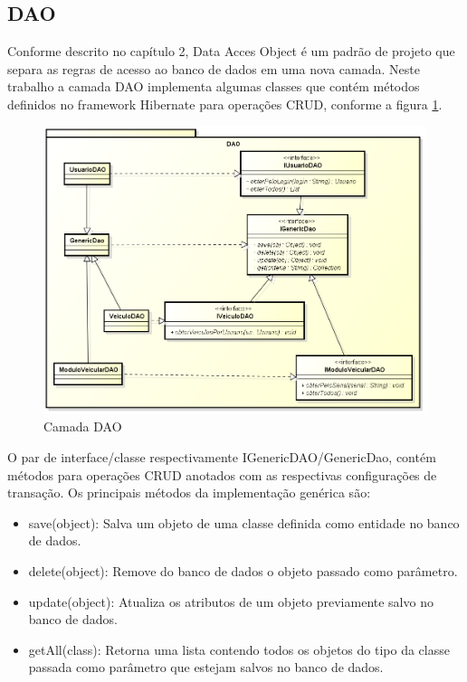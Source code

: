 \subsection{DAO}

Conforme descrito no capítulo 2, Data Acces Object é um padrão de projeto que separa as regras de acesso ao banco de dados em uma nova camada. Neste trabalho a camada DAO implementa algumas classes que contém métodos definidos no framework Hibernate para operações CRUD, conforme a figura \ref{fig:webmandao}.

\begin{figure}[!htb]
	\centering
	\includegraphics[width=\textwidth]{figures/dao_layer.png}
	\caption{Camada DAO}
	\label{fig:webmandao}
\end{figure}

O par de interface/classe respectivamente IGenericDAO/GenericDao, contém métodos para operações CRUD anotados com as respectivas configurações de transação. Os principais métodos da implementação genérica são:

\begin{itemize}
	\item save(object): Salva um objeto de uma classe definida como entidade no banco de dados.
	\item delete(object): Remove do banco de dados o objeto passado como parâmetro.
	\item update(object): Atualiza os atributos de um objeto previamente salvo no banco de dados.
	\item getAll(class): Retorna uma lista contendo todos os objetos do tipo da classe passada como parâmetro que estejam salvos no banco de dados.
\end{itemize}

